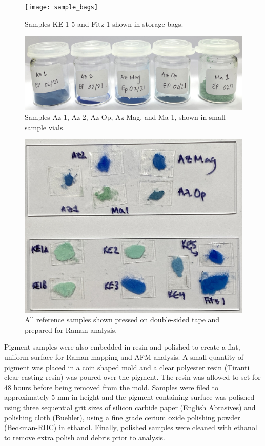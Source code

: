 \begin{figure}[H]
\centering
  \texttt{[image: sample\_bags]}
\caption[Samples KE 1-5 and Fitz 1.]{Samples KE 1-5 and Fitz 1 shown in storage bags.}
\label{fig:sample_bags}
\end{figure}

\begin{figure}[H]
\centering
  \includegraphics[width=0.75\linewidth]{sample_vials}
\caption[Samples Az 1, Az 2, Az Op, Az Mag, and Ma 1.]{Samples Az 1, Az 2, Az Op, Az Mag, and Ma 1, shown in small sample vials.}
\label{fig:sample_vials}
\end{figure}

\begin{figure}[H]
\centering
  \includegraphics[width=0.75\linewidth]{sample_slides}
\caption[All reference samples shown pressed on double-sided tape and prepared for Raman analysis.]{All reference samples shown pressed on double-sided tape and prepared for Raman analysis.}
\label{fig:sample_slides}
\end{figure}

Pigment samples were also embedded in resin and polished to create a flat, uniform surface for Raman mapping and AFM analysis. A small quantity of pigment was placed in a coin shaped mold and a clear polyester resin (Tiranti clear casting resin) was poured over the pigment. The resin was allowed to set for 48 hours before being removed from the mold. Samples were filed to approximately 5 mm in height and the pigment containing surface was polished using three sequential grit sizes of silicon carbide paper (English Abrasives) and polishing cloth (Buehler), using a fine grade cerium oxide polishing powder (Beckman-RIIC) in ethanol. Finally, polished samples were cleaned with ethanol to remove extra polish and debris prior to analysis.


